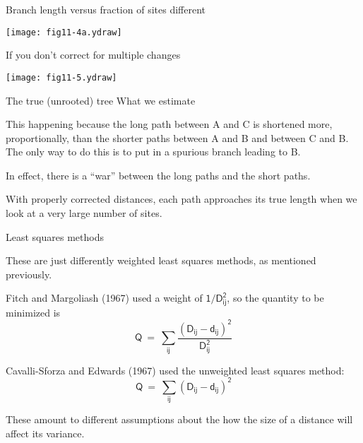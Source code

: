 \documentclass[bluish,slideColor,colorBG,pdf]{prosper}
\begin{document}
\begin{slide}[Replace]{Branch length versus fraction of sites different}

\centerline{\texttt{[image: fig11-4a.ydraw]}}

\end{slide}

\begin{slide}[Replace]{If you don't correct for multiple changes}
\bigskip

\centerline{\texttt{[image: fig11-5.ydraw]}}

\centerline{The true (unrooted) tree  \hspace{1in}  What we estimate}
\bigskip

This happening because the long path between A and C is shortened more,
proportionally, than the shorter paths between A and B and between C and B.
The only way to do this is to put in a spurious branch leading to B.
\medskip

In effect, there is a ``war'' between the long paths and the short paths.
\medskip

With properly corrected distances, each path approaches its true length
when we look at a very large number of sites.

\end{slide}

\begin{slide}[Replace]{Least squares methods}
\bigskip

These are just differently weighted least squares methods, as mentioned
previously.
\bigskip

Fitch and Margoliash (1967) used a weight of  $\mathsf{1 / D_{ij}^2}$, so
the quantity to be minimized is
\[
\mathsf{Q \ = \  \sum\limits_{ij} \frac{\left(D_{ij} - d_{ij}\right)^2}{D_{ij}^2}}
\]
\medskip

Cavalli-Sforza and Edwards (1967) used the unweighted least squares
method:
\[
\mathsf{Q \ = \ \sum\limits_{ij} \left(D_{ij} - d_{ij}\right)^2}
\]

These amount to different assumptions about the how the size of a distance
will affect its variance.

\end{slide}
\end{document}
